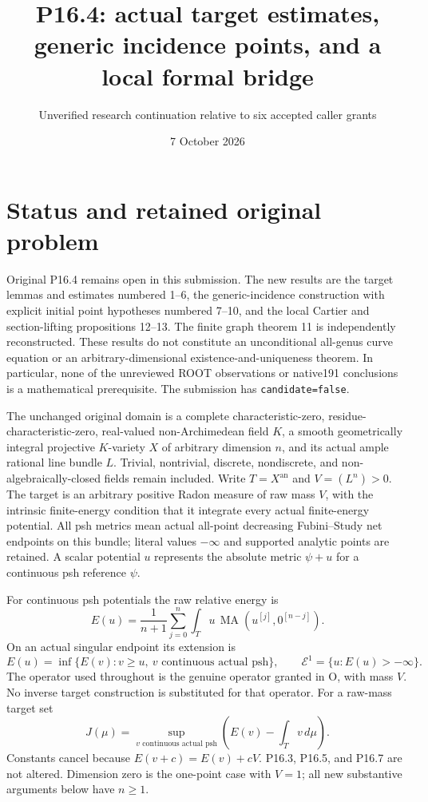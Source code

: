 \documentclass[
  11pt,
]{article}
\title{P16.4: actual target estimates, generic incidence points, and a
local formal bridge}
\author{Unverified research continuation relative to six accepted caller
grants}
\date{7 October 2026}
\begin{document}
\maketitle

\section{Status and retained original
problem}\label{status-and-retained-original-problem}

Original P16.4 remains open in this submission. The new results are the
target lemmas and estimates numbered 1--6, the generic-incidence
construction with explicit initial point hypotheses numbered 7--10, and
the local Cartier and section-lifting propositions 12--13. The finite
graph theorem 11 is independently reconstructed. These results do not
constitute an unconditional all-genus curve equation or an
arbitrary-dimensional existence-and-uniqueness theorem. In particular,
none of the unreviewed ROOT observations or native191 conclusions is a
mathematical prerequisite. The submission has \texttt{candidate=false}.

The unchanged original domain is a complete characteristic-zero,
residue-characteristic-zero, real-valued non-Archimedean field \(K\), a
smooth geometrically integral projective \(K\)-variety \(X\) of
arbitrary dimension \(n\), and its actual ample rational line bundle
\(L\). Trivial, nontrivial, discrete, nondiscrete, and
non-algebraically-closed fields remain included. Write
\(T=X^{\mathrm{an}}\) and \(V=(L^n)>0\). The target is an arbitrary
positive Radon measure of raw mass \(V\), with the intrinsic
finite-energy condition that it integrate every actual finite-energy
potential. All psh metrics mean actual all-point decreasing
Fubini--Study net endpoints on this bundle; literal values \(-\infty\)
and supported analytic points are retained. A scalar potential \(u\)
represents the absolute metric \(\psi+u\) for a continuous psh reference
\(\psi\).

For continuous psh potentials the raw relative energy is \[
 E(u)=\frac1{n+1}\sum_{j=0}^n\int_T u\,\operatorname{MA}(u^{[j]},0^{[n-j]}).
\] On an actual singular endpoint its extension is \[
 E(u)=\inf\{E(v):v\geq u,\ v\text{ continuous actual psh}\},\qquad
 \mathcal E^1=\{u:E(u)>-\infty\}.
\] The operator used throughout is the genuine operator granted in O,
with mass \(V\). No inverse target construction is substituted for that
operator. For a raw-mass target set \[
 J(\mu)=\sup_{v\text{ continuous actual psh}}
              \left(E(v)-\int_T v\,d\mu\right).
\] Constants cancel because \(E(v+c)=E(v)+cV\). P16.3, P16.5, and P16.7
are not altered. Dimension zero is the one-point case with \(V=1\); all
new substantive arguments below have \(n\geq1\).
\end{document}
